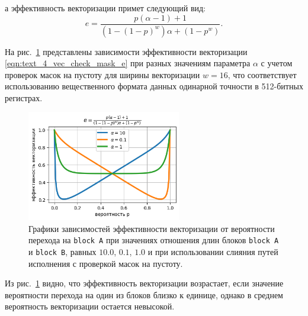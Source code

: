 а эффективность векторизации примет следующий вид:
\begin{equation}\label{eqn:text_4_vec_check_mask_e}
	e = \frac{ p(\alpha - 1) + 1 }{\left(1 - (1 - p)^w\right) \alpha + (1 - p^w) }.
\end{equation}

На рис.~\ref{fig:text_4_vec_check_mask_chart_e_merged} представлены зависимости эффективности векторизации \eqref{eqn:text_4_vec_check_mask_e} при разных значениям параметра $\alpha$ с учетом проверок масок на пустоту для ширины векторизации $w = 16$, что соответствует использованию вещественного формата данных одинарной точности в 512-битных регистрах.

\begin{figure}[ht]
	\centering
		\includegraphics[width=0.6\textwidth]{./pics/text_4_vec_check_mask/chart_e_merged.png}
	\caption{Графики зависимостей эффективности векторизации от вероятности перехода на \texttt{block A} при значениях отношения длин блоков \texttt{block A} и \texttt{block B}, равных $10.0$, $0.1$, $1.0$ и при использовании слияния путей исполнения с проверкой масок на пустоту.}
	\label{fig:text_4_vec_check_mask_chart_e_merged}
\end{figure}

Из рис.~\ref{fig:text_4_vec_check_mask_chart_e_merged} видно, что эффективность векторизации возрастает, если значение вероятности перехода на один из блоков близко к единице, однако в среднем вероятность векторизации остается невысокой.
